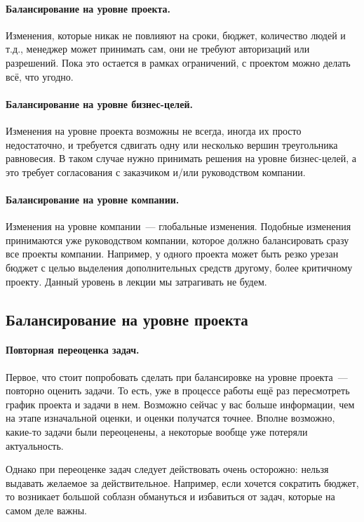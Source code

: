 \documentclass{../../text-style}
\begin{document}
\paragraph{Балансирование на уровне проекта.} Изменения, которые никак не повлияют на сроки, бюджет, количество людей и т.д., менеджер может принимать сам, они не требуют авторизаций или разрешений. Пока это остается в рамках ограничений, с проектом можно делать всё, что угодно.

\paragraph{Балансирование на уровне бизнес-целей.} Изменения на уровне проекта возможны не всегда, иногда их просто недостаточно, и требуется сдвигать одну или несколько вершин треугольника равновесия. В таком случае нужно принимать решения на уровне бизнес-целей, а это требует согласования с заказчиком и/или руководством компании.

\paragraph{Балансирование на уровне компании.} Изменения на уровне компании~--- глобальные изменения. Подобные изменения принимаются уже руководством компании, которое должно балансировать сразу все проекты компании. Например, у одного проекта может быть резко урезан бюджет с целью выделения дополнительных средств другому, более критичному проекту. Данный уровень в лекции мы затрагивать не будем.

\subsection{Балансирование на уровне проекта}

\paragraph{Повторная переоценка задач.} Первое, что стоит попробовать сделать при балансировке на уровне проекта~--- повторно оценить задачи. То есть, уже в процессе работы ещё раз пересмотреть график проекта и задачи в нем. Возможно сейчас у вас больше информации, чем на этапе изначальной оценки, и оценки получатся точнее. Вполне возможно, какие-то задачи были переоценены, а некоторые вообще уже потеряли актуальность.

Однако при переоценке задач следует действовать очень осторожно: нельзя выдавать желаемое за действительное. Например, если хочется сократить бюджет, то возникает большой соблазн обмануться и избавиться от задач, которые на самом деле важны.
\end{document}
